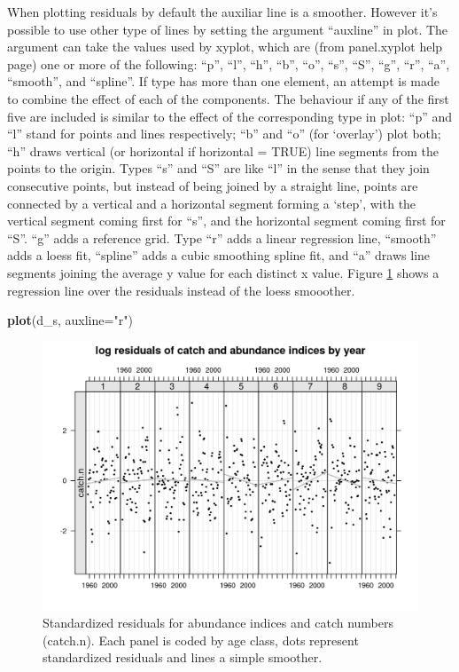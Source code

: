 \documentclass[
]{book}
\newenvironment{Shaded}{\begin{snugshade}}{\end{snugshade}}
\newcommand{\AttributeTok}[1]{\textcolor[rgb]{0.13,0.29,0.53}{#1}}
\newcommand{\FunctionTok}[1]{\textcolor[rgb]{0.13,0.29,0.53}{\textbf{#1}}}
\newcommand{\NormalTok}[1]{#1}
\newcommand{\StringTok}[1]{\textcolor[rgb]{0.31,0.60,0.02}{#1}}
\begin{document}
When plotting residuals by default the auxiliar line is a smoother. However it's possible to use other type of lines by setting the argument ``auxline'' in plot. The argument can take the values used by xyplot, which are (from panel.xyplot help page) one or more of the following: ``p'', ``l'', ``h'', ``b'', ``o'', ``s'', ``S'', ``g'', ``r'', ``a'', ``smooth'', and ``spline''. If type has more than one element, an attempt is made to combine the effect of each of the components. The behaviour if any of the first five are included is similar to the effect of the corresponding type in plot: ``p'' and ``l'' stand for points and lines respectively; ``b'' and ``o'' (for `overlay') plot both; ``h'' draws vertical (or horizontal if horizontal = TRUE) line segments from the points to the origin. Types ``s'' and ``S'' are like ``l'' in the sense that they join consecutive points, but instead of being joined by a straight line, points are connected by a vertical and a horizontal segment forming a `step', with the vertical segment coming first for ``s'', and the horizontal segment coming first for ``S''. ``g'' adds a reference grid. Type ``r'' adds a linear regression line, ``smooth'' adds a loess fit, ``spline'' adds a cubic smoothing spline fit, and ``a'' draws line segments joining the average y value for each distinct x value. Figure \ref{fig:resaux} shows a regression line over the residuals instead of the loess smooother.

\begin{Shaded}
\begin{Highlighting}[]
\FunctionTok{plot}\NormalTok{(d\_s, }\AttributeTok{auxline=}\StringTok{"r"}\NormalTok{)}
\end{Highlighting}
\end{Shaded}

\begin{figure}
\centering
\includegraphics{_bookdown_files/_main_files/figure-html/resaux-1.png}
\caption{\label{fig:resaux}Standardized residuals for abundance indices and catch numbers (catch.n). Each panel is coded by age class, dots represent standardized residuals and lines a simple smoother.}
\end{figure}
\end{document}
